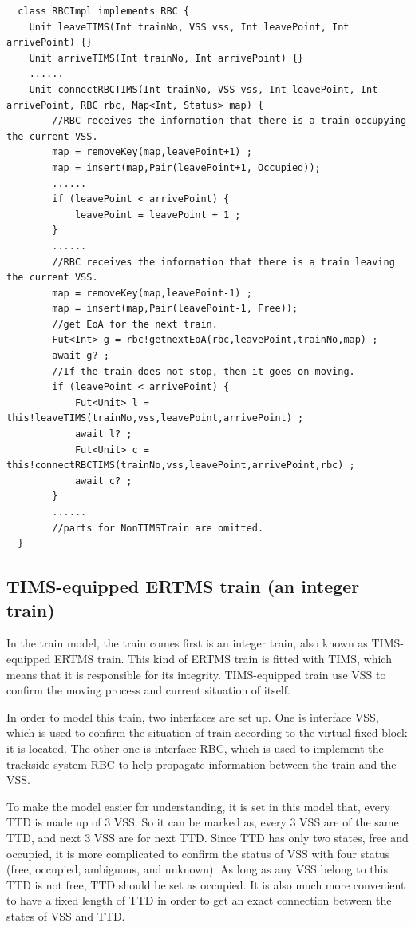 \documentclass[article,dr=phil,type=msc,colorback,accentcolor=tud9c]{tudthesis}
\begin{document}
\begin{itemize}
  \begin{lstlisting}
  class RBCImpl implements RBC {
  	Unit leaveTIMS(Int trainNo, VSS vss, Int leavePoint, Int arrivePoint) {}
  	Unit arriveTIMS(Int trainNo, Int arrivePoint) {}
  	......
  	Unit connectRBCTIMS(Int trainNo, VSS vss, Int leavePoint, Int arrivePoint, RBC rbc, Map<Int, Status> map) {
  		//RBC receives the information that there is a train occupying the current VSS.  
  		map = removeKey(map,leavePoint+1) ;        
  		map = insert(map,Pair(leavePoint+1, Occupied));
  		......
  		if (leavePoint < arrivePoint) {
  			leavePoint = leavePoint + 1 ;
 		}
  		......
  		//RBC receives the information that there is a train leaving the current VSS.  
  		map = removeKey(map,leavePoint-1) ;        
  		map = insert(map,Pair(leavePoint-1, Free));
  		//get EoA for the next train.
  		Fut<Int> g = rbc!getnextEoA(rbc,leavePoint,trainNo,map) ;
  		await g? ;
  		//If the train does not stop, then it goes on moving.
  		if (leavePoint < arrivePoint) {
  			Fut<Unit> l = this!leaveTIMS(trainNo,vss,leavePoint,arrivePoint) ;
  			await l? ;
  			Fut<Unit> c = this!connectRBCTIMS(trainNo,vss,leavePoint,arrivePoint,rbc) ;
  			await c? ;
  		}
  		......
  		//parts for NonTIMSTrain are omitted.
  }\end{lstlisting}

  \end{itemize}

  \subsection{TIMS-equipped ERTMS train (an integer train)}
  
  In the train model, the train comes first is an integer train, also known as TIMS-equipped ERTMS train. This kind of ERTMS train is fitted with TIMS, which means that it is responsible for its integrity. TIMS-equipped train use VSS to confirm the moving process and current situation of itself.
  
  In order to model this train, two interfaces are set up. One is interface VSS, which is used to confirm the situation of train according to the virtual fixed block it is located. The other one is interface RBC, which is used to implement the trackside system RBC to help propagate information between the train and the VSS.
  
  To make the model easier for understanding, it is set in this model that, every TTD is made up of 3 VSS. So it can be marked as, every 3 VSS are of the same TTD, and next 3 VSS are for next TTD. Since TTD has only two states, free and occupied, it is more complicated to confirm the status of VSS with four status (free, occupied, ambiguous, and unknown). As long as any VSS belong to this TTD is not free, TTD should be set as occupied. It is also much more convenient to have a fixed length of TTD in order to get an exact connection between the states of VSS and TTD. 
  
\end{document}
